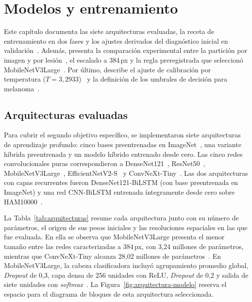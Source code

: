 \chapter{Modelos y entrenamiento}

Este capítulo documenta las siete arquitecturas evaluadas, la receta de entrenamiento en dos fases y los ajustes derivados del diagnóstico inicial en validación~\cite{zhang2024dive}. Además, presenta la comparación experimental entre la partición por imagen y por lesión~\cite{kapoor2023leakage}, el escalado a 384\,px y la regla preregistrada que seleccionó MobileNetV3Large~\cite{howard2019mobilenetv3}. Por último, describe el ajuste de calibración por temperatura ($T = 3{,}2933$)~\cite{guo2017calibration} y la definición de los umbrales de decisión para melanoma~\cite{barata2023reinforcement}.

\section{Arquitecturas evaluadas}

Para cubrir el segundo objetivo específico, se implementaron siete arquitecturas de aprendizaje profundo: cinco bases preentrenadas en ImageNet~\cite{deng2009imagenet}, una variante híbrida preentrenada y un modelo híbrido entrenado desde cero. Las cinco redes convolucionales puras correspondieron a DenseNet121~\cite{huang2017densenet}, ResNet50~\cite{he2016resnet}, MobileNetV3Large~\cite{howard2019mobilenetv3}, EfficientNetV2-S~\cite{tan2021efficientnetv2} y ConvNeXt-Tiny~\cite{liu2022convnext}. Las dos arquitecturas con capas recurrentes fueron DenseNet121-BiLSTM (con base preentrenada en ImageNet) y una red CNN-BiLSTM entrenada íntegramente desde cero sobre HAM10000~\cite{zhang2024dive,tschandl2018ham10000}.

La Tabla~\ref{tab:arquitecturas} resume cada arquitectura junto con su número de parámetros, el origen de sus pesos iniciales y las resoluciones espaciales en las que fue evaluada. En ella se observa que MobileNetV3Large presenta el menor tamaño entre las redes caracterizadas a 384\,px, con 3,24 millones de parámetros, mientras que ConvNeXt-Tiny alcanza 28,02 millones de parámetros~\cite{howard2019mobilenetv3,liu2022convnext}. En MobileNetV3Large, la cabeza clasificadora incluyó agrupamiento promedio global, \textit{Dropout} de 0,3, capa densa de 256 unidades con ReLU, \textit{Dropout} de 0,2 y salida de siete unidades con \textit{softmax}~\cite{howard2019mobilenetv3,zhang2024dive}. La Figura~\ref{fig:arquitectura-modelo} reserva el espacio para el diagrama de bloques de esta arquitectura seleccionada.

